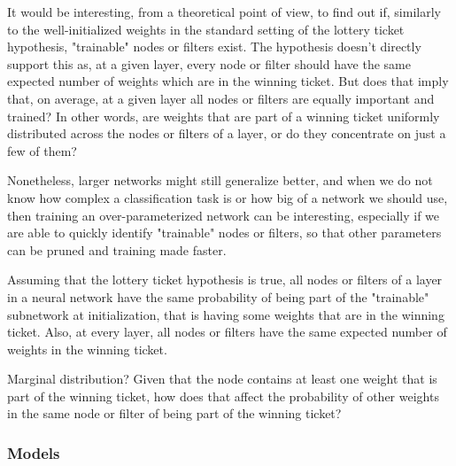It would be interesting, from a theoretical point of view, to find out if, similarly to the well-initialized weights in the standard setting of the lottery ticket hypothesis, "trainable" nodes or filters exist. The hypothesis doesn't directly support this as, at a given layer, every node or filter should have the same expected number of weights which are in the winning ticket. But does that imply that, on average, at a given layer all nodes or filters are equally important and trained? In other words, are weights that are part of a winning ticket uniformly distributed across the nodes or filters of a layer, or do they concentrate on just a few of them?

Nonetheless, larger networks might still generalize better, and when we do not know how complex a classification task is or how big of a network we should use, then training an over-parameterized network can be interesting, especially if we are able to quickly identify "trainable" nodes or filters, so that other parameters can be pruned and training made faster. 

Assuming that the lottery ticket hypothesis is true, all nodes or filters of a layer in a neural network have the same probability of being part of the "trainable" subnetwork at initialization, that is having some weights that are in the winning ticket. Also, at every layer, all nodes or filters have the same expected number of weights in the winning ticket. 

Marginal distribution? Given that the node contains at least one weight that is part of the winning ticket, how does that affect the probability of other weights in the same node or filter of being part of the winning ticket?

\subsubsection*{Models}

